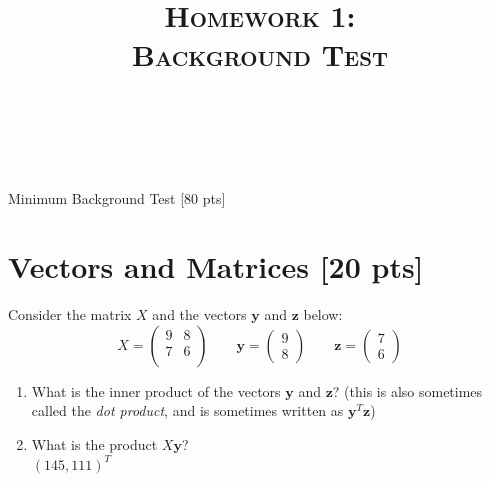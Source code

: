 \documentclass[a4paper]{article}
\title{\textsc{Homework 1: \\ Background Test}} %
\author{
\red{$>>$Jurijs Nazarovs$<<$} \\
\red{$>>$9075604125$<<$}\\
}
\date{}
\theoremstyle{definition}
\newenvironment{soln}{
    \leavevmode\color{blue}\ignorespaces
}{}
\begin{document}
\maketitle 


\begin{center}
\Huge
Minimum Background Test [80 pts]
\end{center}

\section{Vectors and Matrices [20 pts]}
Consider the matrix $X$ and the vectors $\mathbf{y}$ and $\textbf{z}$ below:
$$
X = \begin{pmatrix}
9 & 8 \\ 7 & 6 \\
\end{pmatrix}
\qquad \mathbf{y} = \begin{pmatrix}
9 \\ 8
\end{pmatrix} \qquad \mathbf{z} = \begin{pmatrix}
7 \\ 6
\end{pmatrix}
$$
\begin{enumerate}
	\item 	What is the inner product of the vectors $\mathbf{y}$ and $\mathbf{z}$? (this is also sometimes called the \emph{dot product}, and is sometimes written as $\mathbf{y}^T\mathbf{z}$)\\
	     \begin{soln}111\end{soln}
	\item 	What is the product $X\mathbf{y}$?\\
	     \begin{soln}$(145, 111)^T$\end{soln}
\end{enumerate}
\end{document}
